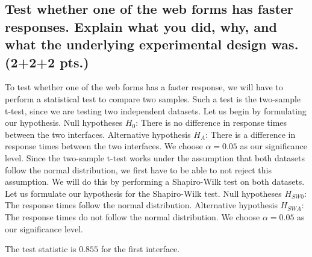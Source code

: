 \documentclass[a4paper]{article}
\begin{document}
\subsection{Test whether one of the web forms has faster responses. Explain what you did, why, and what the underlying experimental design was. (2+2+2 pts.)}
To test whether one of the web forms has a faster response, we will have to perform a statistical test to compare two samples. Such a test is the two-sample t-test, since we are testing two independent datasets. Let us begin by formulating our hypothesis. \newline\newline
Null hypotheses $H_0$: There is no difference in response times between the two interfaces. \newline
Alternative hypothesis $H_A$: There is a difference in response times between the two interfaces.
We choose $\alpha = 0.05$ as our significance level. \newline\newline
Since the two-sample t-test works under the assumption that both datasets follow the normal distribution, we first have to be able to not reject this assumption. We will do this by performing a Shapiro-Wilk test on both datasets. Let us formulate our hypothesis for the Shapiro-Wilk test. \newline\newline
Null hypotheses $H_{SW0}$: The response times follow the normal distribution. \newline
Alternative hypothesis $H_{SWA}$: The response times do not follow the normal distribution. \newline
We choose $\alpha = 0.05$ as our significance level.\newline\newline
{}
The test statistic is $0.855$ for the first interface.
\end{document}
